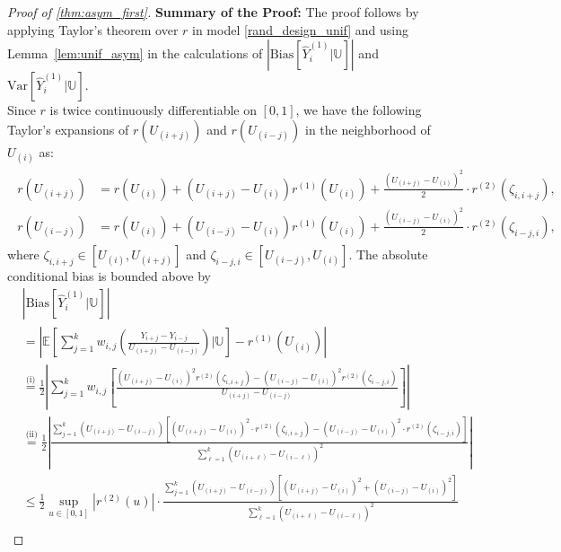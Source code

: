\documentclass{uwstat572}
\theoremstyle{definition}
\renewcommand{\hat}{\widehat}
\theoremstyle{theorem}
\begin{document}
\begin{proof}[Proof of \autoref{thm:asym_first}]
{\bf Summary of the Proof:} The proof follows by applying Taylor's theorem over $r$ in model \eqref{rand_design_unif} and using Lemma~\ref{lem:unif_asym} in the calculations of $\left|\mathrm{Bias}\left[\hat{Y}_i^{(1)} \big| \mathbb{U}\right] \right|$ and $\mathrm{Var}\left[\hat{Y}_i^{(1)} \big| \mathbb{U}\right]$.\\

Since $r$ is twice continuously differentiable on $[0,1]$, we have the following Taylor's expansions of $r(U_{(i+j)})$ and $r(U_{(i-j)})$ in the neighborhood of $U_{(i)}$ as:
\begin{align}
\label{r_taylor}
\begin{split}
r(U_{(i+j)}) &= r(U_{(i)}) + \left(U_{(i+j)} -U_{(i)}\right) r^{(1)}(U_{(i)}) + \frac{\left(U_{(i+j)} - U_{(i)}\right)^2}{2} \cdot r^{(2)}(\zeta_{i,i+j}), \\
r(U_{(i-j)}) &= r(U_{(i)}) + \left(U_{(i-j)} -U_{(i)}\right) r^{(1)}(U_{(i)}) + \frac{\left(U_{(i-j)} - U_{(i)}\right)^2}{2} \cdot r^{(2)}(\zeta_{i-j,i}),
\end{split}
\end{align}
where $\zeta_{i,i+j}\in \left[U_{(i)}, U_{(i+j)}\right]$ and $\zeta_{i-j,i} \in \left[U_{(i-j)}, U_{(i)}\right]$. The absolute conditional bias is bounded above by
\begin{align*}
&\left|\mathrm{Bias}\left[\hat{Y}_i^{(1)} \big| \mathbb{U}\right] \right| \\
&= \left|\mathbb{E}\left[\sum_{j=1}^k w_{i,j}\left(\frac{Y_{i+j} - Y_{i-j}}{U_{(i+j)} - U_{(i-j)}}\right) \Big| \mathbb{U} \right] - r^{(1)}(U_{(i)}) \right|\\
&\stackrel{\text{(i)}}{=} \frac{1}{2} \left|\sum_{j=1}^k w_{i,j}\left[\frac{(U_{(i+j)} - U_{(i)})^2 r^{(2)}(\zeta_{i,i+j}) - (U_{(i-j)} - U_{(i)})^2 r^{(2)}(\zeta_{i-j,i})}{U_{(i+j)} - U_{(i-j)}} \right] \right|\\
&\stackrel{\text{(ii)}}{=} \frac{1}{2} \left|\frac{\sum_{j=1}^k (U_{(i+j)} - U_{(i-j)}) \left[(U_{(i+j)} - U_{(i)})^2 \cdot r^{(2)}(\zeta_{i,i+j}) - (U_{(i-j)} - U_{(i)})^2 \cdot r^{(2)}(\zeta_{i-j,i}) \right]}{\sum_{\ell=1}^k \left(U_{(i+\ell)} - U_{(i-\ell)}\right)^2} \right| \\
&\leq \frac{1}{2} \sup_{u\in [0,1]} \left|r^{(2)}(u) \right| \cdot \frac{\sum_{j=1}^k (U_{(i+j)} - U_{(i-j)}) \left[(U_{(i+j)} - U_{(i)})^2 + (U_{(i-j)} - U_{(i)})^2 \right]}{\sum_{\ell=1}^k \left(U_{(i+\ell)} - U_{(i-\ell)}\right)^2}\\

\end{align*}
\end{proof}
\end{document}
